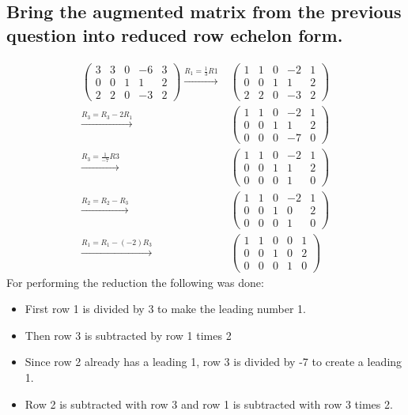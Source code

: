 \documentclass[12pt, a4paper]{article}
\begin{document}
		\subsection{Bring the augmented matrix from the previous question into reduced row echelon form.}
			\begin{align}
				\left(
				    \begin{array}{cccc|c}
				    3&3&0&-6&3\\ 
				    0&0&1&1&2\\
				    2&2&0&-3&2
				    \end{array}
				\right)\xrightarrow{R_1=\frac{1}{3}R1}&
				\left(
				    \begin{array}{cccc|c}
				    1&1&0&-2&1\\ 
				    0&0&1&1&2\\
				    2&2&0&-3&2
				    \end{array}
				\right)\\
				\xrightarrow{R_3=R_3-2R_1}&\left(
				    \begin{array}{cccc|c}
				    1&1&0&-2&1\\ 
				    0&0&1&1&2\\
				    0&0&0&-7&0
				    \end{array}
				\right)\\
				\xrightarrow{R_3=\frac{1}{-7}R3}&\left(
				    \begin{array}{cccc|c}
				    1&1&0&-2&1\\ 
				    0&0&1&1&2\\
				    0&0&0&1&0
				    \end{array}
				\right)\\
				\xrightarrow{R_2=R_2-R_3}&\left(
				    \begin{array}{cccc|c}
				    1&1&0&-2&1\\ 
				    0&0&1&0&2\\
				    0&0&0&1&0
				    \end{array}
				\right)\\
				\xrightarrow{R_1=R_1-(-2)R_3}&\left(
				    \begin{array}{cccc|c}
				    1&1&0&0&1\\ 
				    0&0&1&0&2\\
				    0&0&0&1&0
				    \end{array}
				\right)
			\end{align}
			For performing the reduction the following was done:
			\begin{itemize}
				\item First row 1 is divided by 3 to make the leading number 1.\\
				\item Then row 3 is subtracted by row 1 times 2\\
				\item Since row 2 already has a leading 1, row 3 is divided by -7 to create a leading 1.\\
				\item Row 2 is subtracted with row 3 and row 1 is subtracted with row 3 times 2.
			\end{itemize}	    
\end{document}
